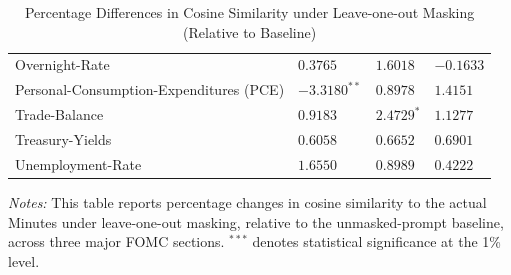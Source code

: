 \begin{table}[htbp]
\begin{threeparttable}
\begin{tabular}{p{3.6cm} p{4.3cm} p{3.1cm} p{3.1cm}}
Overnight-Rate & $0.3765$ & $1.6018$ & $-0.1633$ \\
Personal-Consumption-Expenditures (PCE) & $\mathbf{-3.3180^{**}}$ & $0.8978$ & $1.4151$ \\
Trade-Balance & $0.9183$ & $\mathbf{2.4729^{*}}$ & $1.1277$ \\
Treasury-Yields & $0.6058$ & $0.6652$ & $0.6901$ \\
Unemployment-Rate & $1.6550$ & $0.8989$ & $0.4222$ \\
\bottomrule
\end{tabular}
\begin{tablenotes}[flushleft]
\footnotesize
\item \textit{Notes:} This table reports percentage changes in cosine similarity to the actual Minutes under leave-one-out masking, relative to the unmasked-prompt baseline, across three major FOMC sections. 
$^{***}$ denotes statistical significance at the 1\% level.
\end{tablenotes}
\caption{Percentage Differences in Cosine Similarity under Leave-one-out Masking (Relative to Baseline)}
\label{tab:ch2:shapley_diff_by_raw_result}
\end{threeparttable}
\end{table}

